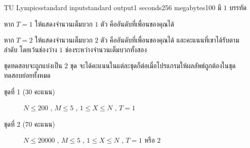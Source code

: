 \documentclass[11pt,a4paper]{article}
\begin{document}
\begin{problem}{TU Lympics}{standard input}{standard output}{1 seconds}{256 megabytes}{100}
\OutputFile
มี $1$ บรรทัด 

หาก $T = 1$ ให้แสดงจำนวนเต็มบวก $1$ ตัว คืออันดับที่เพื่อนของคุณได้ 

หาก $T = 2$ ให้แสดงจำนวนเต็มบวก $2$ ตัว คืออันดับที่เพื่อนของคุณได้ และคะแนนที่เขาได้รับตามลำดับ โดยเว้นช่องว่าง $1$ ช่องระหว่างจำนวนเต็มบวกทั้งสอง

\Scoring
ชุดทดสอบจะถูกแบ่งเป็น $2$ ชุด จะได้คะแนนในแต่ละชุดก็ต่อเมื่อโปรแกรมให้ผลลัพธ์ถูกต้องในชุดทดสอบย่อยทั้งหมด

\begin{description}

\item[ชุดที่ 1 (30 คะแนน)]  $N \leq 200$ , $M \leq 5$ , $1 \leq X \leq N$ , $T=1$

\item[ชุดที่ 2 (70 คะแนน)]  $N\leq20000$  , $M\leq5$ , $1 \leq X \leq N $ , $T=1$ หรือ $2$

\end{description}

\Examples

\begin{example}
%
%
\end{example}

\end{problem}
\end{document}
